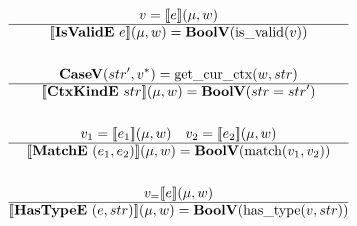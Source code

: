 \begin{gather*}
%
\newline \\
  v = \sem{e}(\mu, w) \\
  \hline
  \sem{\isvalide ~ e}(\mu, w) = \boolv (\isvalid(v)) \\
%
\newline \\
  \casev (str', \seq v) = \getcurctx(w, str) \\
  \hline
  \sem{\ctxkinde ~ str}(\mu, w) = \boolv (str = str') \\
%
\newline \\
  v_1 = \sem{e_1}(\mu, w) \quad
  v_2 = \sem{e_2}(\mu, w) \\
  \hline
  \sem{\matche ~ (e_1, e_2)}(\mu, w) = \boolv (\match(v_1, v_2)) \\
%
\newline \\
  v_= \sem{e}(\mu, w) \\
  \hline
  \sem{\hastypee ~ (e, str)}(\mu, w) = \boolv (\hastype(v, str)) \\
\end{gather*}





